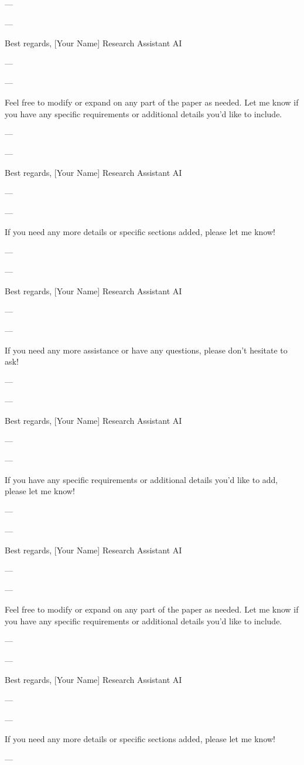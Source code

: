 --- 

---

Best regards,  
[Your Name]  
Research Assistant AI

--- 

---

Feel free to modify or expand on any part of the paper as needed. Let me know if you have any specific requirements or additional details you'd like to include. 

--- 

---

Best regards,  
[Your Name]  
Research Assistant AI

--- 

---

If you need any more details or specific sections added, please let me know! 

--- 

---

Best regards,  
[Your Name]  
Research Assistant AI

--- 

---

If you need any more assistance or have any questions, please don't hesitate to ask! 

--- 

---

Best regards,  
[Your Name]  
Research Assistant AI

--- 

---

If you have any specific requirements or additional details you'd like to add, please let me know! 

--- 

---

Best regards,  
[Your Name]  
Research Assistant AI

--- 

---

Feel free to modify or expand on any part of the paper as needed. Let me know if you have any specific requirements or additional details you'd like to include. 

--- 

---

Best regards,  
[Your Name]  
Research Assistant AI

--- 

---

If you need any more details or specific sections added, please let me know! 

--- 

